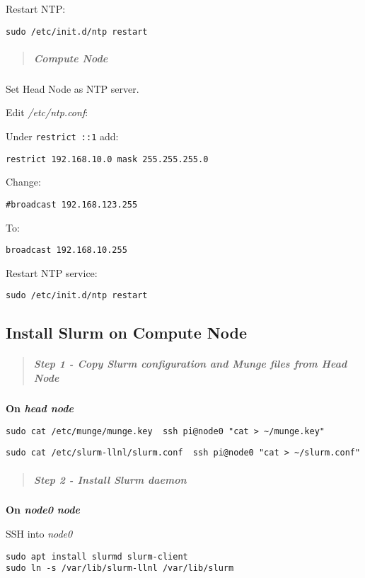\documentclass[]{article}
\let\oldsubparagraph\subparagraph
\renewcommand{\subparagraph}[1]{\oldsubparagraph{#1}\mbox{}}
\begin{document}
Restart NTP:

\texttt{sudo\ /etc/init.d/ntp\ restart}

\begin{quote}
\mbox{}%
\subparagraph{Compute Node}\label{compute-node}
\end{quote}

Set Head Node as NTP server.

Edit \emph{/etc/ntp.conf}:

Under \texttt{restrict\ ::1} add:

\texttt{restrict\ 192.168.10.0\ mask\ 255.255.255.0}

Change:

\texttt{\#broadcast\ 192.168.123.255}

To:

\texttt{broadcast\ 192.168.10.255}

Restart NTP service:

\texttt{sudo\ /etc/init.d/ntp\ restart}

\subsection{Install Slurm on Compute
Node}\label{install-slurm-on-compute-node}

\begin{quote}
\mbox{}%
\subparagraph{\texorpdfstring{Step 1 - Copy Slurm configuration and
Munge files from \emph{Head
Node}}{Step 1 - Copy Slurm configuration and Munge files from Head Node}}\label{step-1---copy-slurm-configuration-and-munge-files-from-head-node}
\end{quote}

\textbf{On \emph{head node}}

\texttt{sudo\ cat\ /etc/munge/munge.key\ \textbar{}\ ssh\ pi@node0\ "cat\ \textgreater{}\ \textasciitilde{}/munge.key"}

\texttt{sudo\ cat\ /etc/slurm-llnl/slurm.conf\ \textbar{}\ ssh\ pi@node0\ "cat\ \textgreater{}\ \textasciitilde{}/slurm.conf"}

\begin{quote}
\mbox{}%
\subparagraph{Step 2 - Install Slurm
daemon}\label{step-2---install-slurm-daemon}
\end{quote}

\textbf{On \emph{node0 node}}

SSH into \emph{node0}

\begin{verbatim}
sudo apt install slurmd slurm-client
sudo ln -s /var/lib/slurm-llnl /var/lib/slurm
\end{verbatim}
\end{document}
